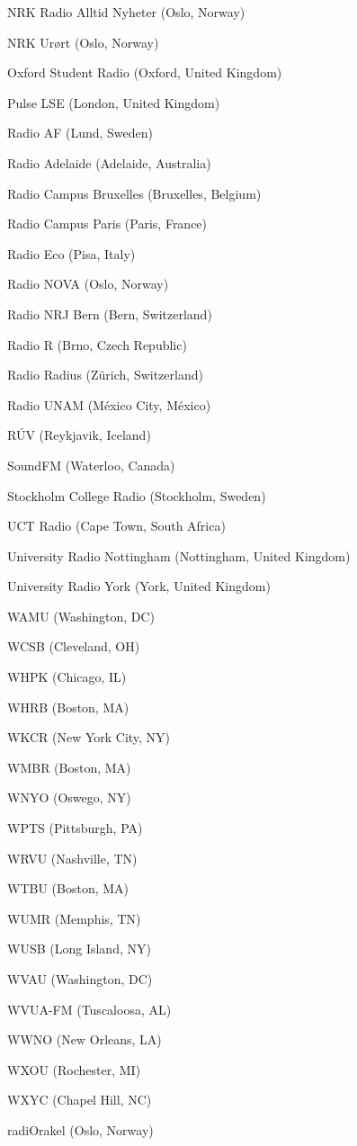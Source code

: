 \documentclass[20pt,landscape]{foils}
\begin{document}
\begin{list1}
\begin{list2}
  \item NRK Radio Alltid Nyheter (Oslo, Norway)
  \item NRK Ur{\o}rt (Oslo, Norway)
  \item Oxford Student Radio (Oxford, United Kingdom)
  \item Pulse LSE (London, United Kingdom)
  \item Radio AF (Lund, Sweden)
  \item Radio Adelaide (Adelaide, Australia)
  \item Radio Campus Bruxelles (Bruxelles, Belgium)
  \item Radio Campus Paris (Paris, France)
  \item Radio Eco (Pisa, Italy)
  \item Radio NOVA (Oslo, Norway)
  \item Radio NRJ Bern (Bern, Switzerland)
  \item Radio R (Brno, Czech Republic)
  \item Radio Radius (Zürich, Switzerland)
  \item Radio UNAM (México City, México)
  \item RÚV (Reykjavik, Iceland)
  \item SoundFM (Waterloo, Canada)
  \item Stockholm College Radio (Stockholm, Sweden)
  \item UCT Radio (Cape Town, South Africa)
  \item University Radio Nottingham (Nottingham, United Kingdom)
  \item University Radio York (York, United Kingdom)
  \item WAMU (Washington, DC)
  \item WCSB (Cleveland, OH)
  \item WHPK (Chicago, IL)
  \item WHRB (Boston, MA)
  \item WKCR (New York City, NY)
  \item WMBR (Boston, MA) 
  \item WNYO (Oswego, NY)
  \item WPTS (Pittsburgh, PA)
  \item WRVU (Nashville, TN)
  \item WTBU (Boston, MA)
  \item WUMR (Memphis, TN)
  \item WUSB (Long Island, NY)
  \item WVAU (Washington, DC)
  \item WVUA-FM (Tuscaloosa, AL)
  \item WWNO (New Orleans, LA)
  \item WXOU (Rochester, MI)
  \item WXYC (Chapel Hill, NC)
  \item radiOrakel (Oslo, Norway)
  \end{list2}
\end{list1}
\end{document}
